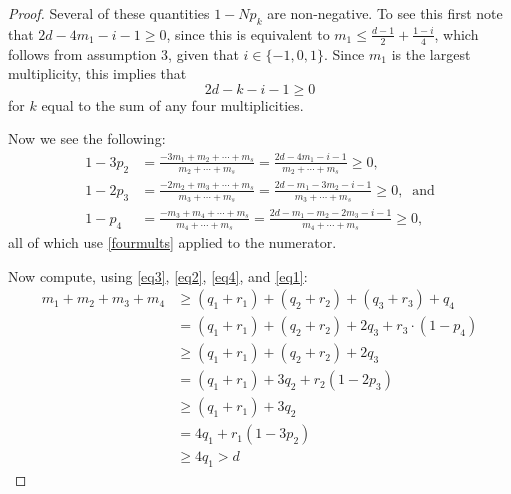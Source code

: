 \documentclass[12pt]{article}
\numberwithin{equation}{section}
\numberwithin{equation}{section}
\numberwithin{subeq}{equation}
\begin{document}
\begin{proof}
Several of these quantities $1-Np_k$ are non-negative.
To see this first note that $2d-4m_1-i-1 \geq 0$,
since this is equivalent to $m_1 \leq \frac{d-1}{2} + \frac{1-i}{4}$,
which follows from assumption 3, given that $i \in \{-1,0,1\}$.
Since $m_1$ is the largest multiplicity,
this implies that
\begin{equation}\label{fourmults}
2d-k-i-1 \geq 0
\end{equation}
for $k$ equal to the sum of any four multiplicities.

Now we see the following:
\begin{equation}\label{eq1}
\begin{split}
1-3p_2 &= \frac{-3m_1+m_2+\cdots + m_s}{m_2+\cdots + m_s}
	= \frac{2d-4m_1-i-1}{m_2+\cdots + m_s} \geq 0,\\
1-2p_3 &= \frac{-2m_2+m_3+\cdots + m_s}{m_3+\cdots + m_s}
	= \frac{2d-m_1-3m_2-i-1}{m_3+\cdots + m_s} \geq 0,\;\;\text{and}\\
1-p_4 &= \frac{-m_3+m_4+\cdots + m_s}{m_4+\cdots + m_s}
	= \frac{2d-m_1-m_2-2m_3-i-1}{m_4+\cdots + m_s} \geq 0,
%
\end{split}
\end{equation}
all of which use \eqref{fourmults} applied to the numerator.
 

Now compute, using \eqref{eq3}, \eqref{eq2}, \eqref{eq4}, and \eqref{eq1}:
\[
\begin{split}
m_1+m_2+m_3+m_4 & \geq (q_1+r_1) + (q_2+r_2) + (q_3+r_3) + q_4 \\
&=(q_1+r_1) + (q_2 + r_2) + 2 q_3 +	r_3 \cdot (1-p_4)\\
&\geq (q_1+r_1) + (q_2 + r_2) + 2q_3 \\
&= (q_1+r_1) + 3q_2 + r_2(1-2p_3) \\
&\geq  (q_1+r_1) + 3q_2 \\
& = 4q_1 + r_1(1-3p_2) \\
&\geq 4q_1 > d
\end{split}
\]
\end{proof}
\end{document}
